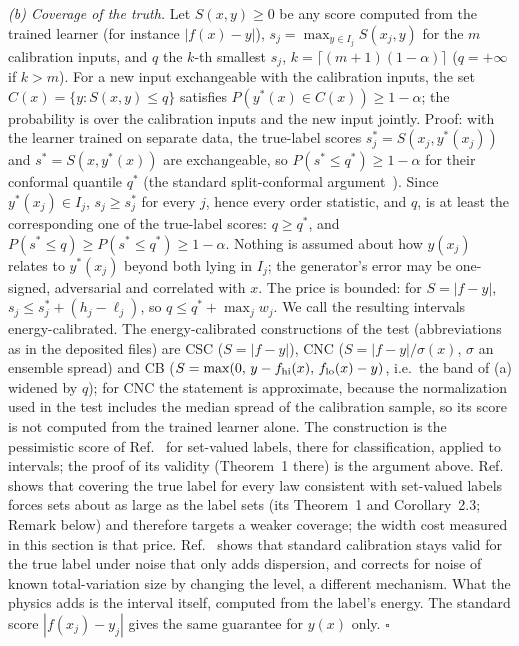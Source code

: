 \documentclass[aps,prx,onecolumn,10pt,nofootinbib,longbibliography,floatfix]{revtex4-2}
\theoremstyle{remark}
\begin{document}
\emph{(b) Coverage of the truth.} Let $S(x,y)\ge0$ be any score computed from the trained learner (for instance
$|f(x)-y|$), $s_j=\max_{y\in I_j}S(x_j,y)$ for the $m$ calibration inputs, and $q$ the
$k$-th smallest $s_j$, $k=\lceil(m+1)(1-\alpha)\rceil$ ($q=+\infty$ if $k>m$). For a new input exchangeable with the
calibration inputs, the set $C(x)=\{y:S(x,y)\le q\}$ satisfies
$P(y^*(x)\in C(x))\ge1-\alpha$; the probability is over the calibration inputs and the new input jointly. Proof: with the learner trained on separate data, the true-label scores
$s_j^*=S(x_j,y^*(x_j))$ and $s^*=S(x,y^*(x))$ are exchangeable, so $P(s^*\le q^*)\ge1-\alpha$ for their conformal
quantile $q^*$ (the standard split-conformal argument~\cite{angelopoulos2021}). Since $y^*(x_j)\in I_j$,
$s_j\ge s_j^*$ for every $j$, hence every order statistic, and $q$, is at least the corresponding one of the
true-label scores: $q\ge q^*$, and $P(s^*\le q)\ge P(s^*\le q^*)\ge1-\alpha$. Nothing is assumed about how $y(x_j)$
relates to $y^*(x_j)$ beyond both lying in $I_j$; the generator's error may be one-signed, adversarial and correlated
with $x$. The price is bounded: for $S=|f-y|$, $s_j\le s_j^*+(h_j-\ell_j)$, so $q\le q^*+\max_jw_j$. We call the
resulting intervals energy-calibrated. The energy-calibrated constructions of the test (abbreviations as in the
deposited files) are CSC ($S=|f-y|$), CNC ($S=|f-y|/\sigma(x)$, $\sigma$ an ensemble spread) and CB
($S=\max(0,\,y-f_{\rm hi}(x),\,f_{\rm lo}(x)-y)$, i.e.\ the band of (a) widened by $q$); for CNC the statement is
approximate, because the normalization used in the test includes the median spread of the calibration sample, so its
score is not computed from the trained learner alone. The construction is the pessimistic score of
Ref.~\cite{javanmardi2023} for set-valued labels, there for classification, applied to intervals; the proof of its
validity (Theorem~1 there) is the argument above. Ref.~\cite{cauchois2022} shows that covering the true label for %
every law consistent with set-valued labels forces sets about as large as the label sets (its Theorem~1 and %
Corollary~2.3; Remark below) and therefore targets a weaker coverage; the width cost measured in this section is %
that price. Ref.~\cite{einbinder2022} shows that standard calibration stays valid for the true label under noise
that only adds dispersion, and corrects for noise of known total-variation size by changing the level, a different
mechanism. What the physics adds is the interval itself, computed from the label's energy. The standard score
$|f(x_j)-y_j|$ gives the same guarantee for $y(x)$ only. $\square$
\end{document}
